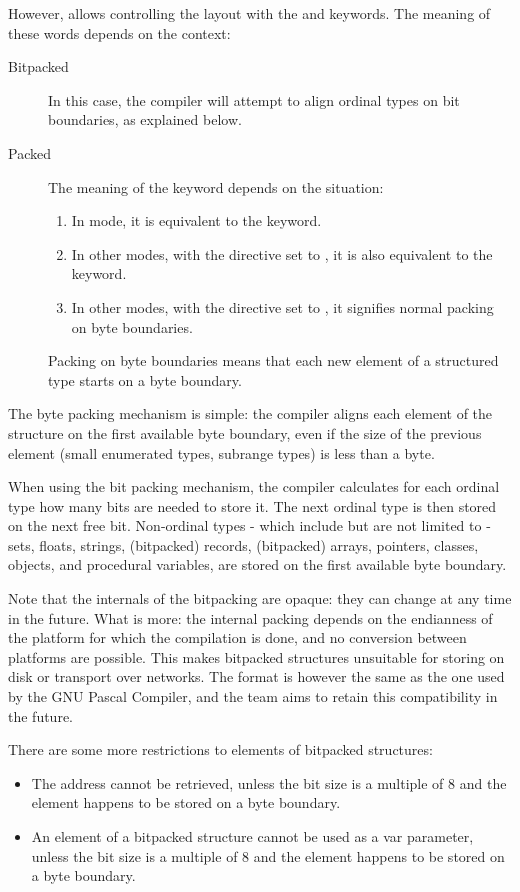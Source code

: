  
However, \fpc allows controlling the layout with the  and
 keywords. The meaning of these words depends on the context:
\begin{description}
\item[Bitpacked] In this case, the compiler will attempt to align ordinal
types on bit boundaries, as explained below.
\item[Packed] The meaning of the  keyword depends on the
situation:
\begin{enumerate}
\item In  mode, it is equivalent to the  keyword.
\item In other modes, with the  directive set to ,
it is also equivalent to the  keyword.
\item In other modes, with the  directive set to ,
it signifies normal packing on byte boundaries.
\end{enumerate}
Packing on byte boundaries means that each new element of a structured type
starts on a byte boundary.
\end{description}

The byte packing mechanism is simple: the compiler aligns each element of
the structure on the first available byte boundary, even if the size of the
previous element (small enumerated types, subrange types) is less than a
byte.

When using the bit packing mechanism, the compiler calculates for each
ordinal type how many bits are needed to store it. The next ordinal type
is then stored on the next free bit. Non-ordinal types - which include but
are not limited to - sets, floats, strings, (bitpacked) records, (bitpacked)
arrays, pointers, classes, objects, and procedural variables, are stored
on the first available byte boundary.

Note that the internals of the bitpacking are opaque: they can change
at any time in the future. What is more: the internal packing depends
on the endianness of the platform for which the compilation is done,
and no conversion between platforms are possible. This makes bitpacked
structures unsuitable for storing on disk or transport over networks.
The format is however the same as the one used by the GNU Pascal
Compiler, and the \fpc team aims to retain this compatibility in the future.

There are some more restrictions to elements of bitpacked structures:
\begin{itemize}
\item The address cannot be retrieved, unless the bit size is a multiple of
8 and the element happens to be stored on a byte boundary.
\item An element of a bitpacked structure cannot be used as a var parameter,
unless the bit size is a multiple of 8 and the element happens to be stored 
on a byte boundary.
\end{itemize}

